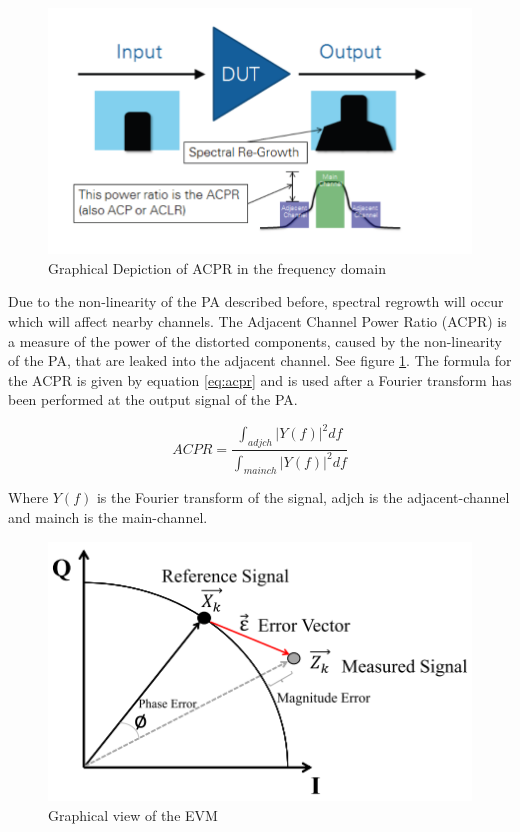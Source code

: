 \begin{figure}[H]
\centering 
\includegraphics[scale = 0.5]{figures/ch1/acpr.png}
\caption{Graphical Depiction of ACPR in the frequency domain \citep{NI}}
\label{fig:acpr}
\end{figure}

Due to the non-linearity of the PA described before, spectral regrowth will occur which will affect nearby channels. The Adjacent Channel Power Ratio (ACPR) is a measure of the power of the distorted components, caused by the non-linearity of the PA, that are leaked into the adjacent channel. See figure \ref{fig:acpr}. The formula for the ACPR is given by equation \ref{eq:acpr} and is used after a Fourier transform has been performed at the output signal of the PA.

\begin{equation} \label{eq:acpr}
	ACPR = \frac{\int_{adjch}^{} |Y(f)|^2 df }{\int_{mainch}^{} |Y(f)|^2 df}
\end{equation}   

Where $Y(f)$ is the Fourier transform of the signal, adjch is the adjacent-channel and mainch is the main-channel. 

\begin{figure}[H]
\centering 
\includegraphics[scale = 0.8]{figures/ch1/evm.png}
\caption{Graphical view of the EVM}
\label{fig:evm}
\end{figure}
  
